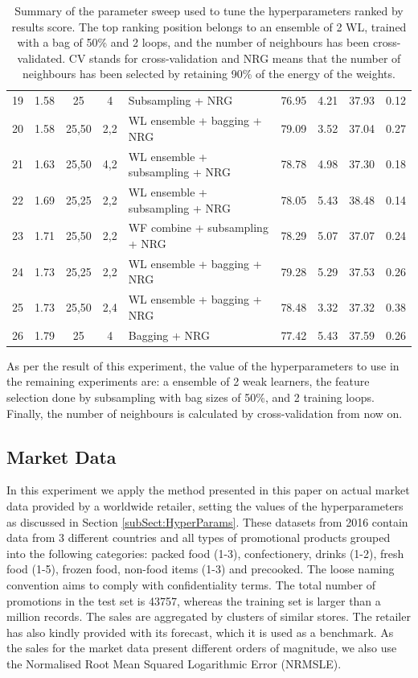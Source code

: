 \documentclass{ieeeaccess}
\begin{document}
\begin{table}[!htbp]
{\begin{tabular}{cccclrrrr}
 19 & 1.58 & 25 & 4 & Subsampling + NRG & 76.95 & 4.21 & 37.93 & 0.12 \\
 20 & 1.58 & 25,50 & 2,2 & WL ensemble + bagging + NRG & 79.09 & 3.52 & 37.04 & 0.27 \\
 21 & 1.63 & 25,50 & 4,2 & WL ensemble + subsampling + NRG & 78.78 & 4.98 & 37.30 & 0.18 \\
 22 & 1.69 & 25,25 & 2,2 & WL ensemble + subsampling + NRG & 78.05 & 5.43 & 38.48 & 0.14 \\
 23 & 1.71 & 25,50 & 2,2 & WF combine + subsampling + NRG & 78.29 & 5.07 & 37.07 & 0.24 \\
 24 & 1.73 & 25,25 & 2,2 & WL ensemble + bagging + NRG & 79.28 & 5.29 & 37.53 & 0.26 \\
 25 & 1.73 & 25,50 & 2,4 & WL ensemble + bagging + NRG & 78.48 & 3.32 & 37.32 & 0.38 \\
 26 & 1.79 & 25 & 4 & Bagging + NRG & 77.42 & 5.43 & 37.59 & 0.26 \\
\bottomrule
\end{tabular}}
\caption{Summary of the parameter sweep used to tune the hyperparameters ranked by results score. The top ranking position belongs to an ensemble of 2 WL, trained with a bag of 50\% and 2 loops, and the number of neighbours has been cross-validated. CV stands for cross-validation and NRG means that the number of neighbours has been selected by  retaining 90\% of the energy of the weights.} 
\label{tab:Hyperparameters}
\end{table}
%
As per the result of this experiment, the value of the hyperparameters to use in the remaining experiments are: a ensemble of 2 weak learners, the feature selection done by subsampling with bag sizes of 50\%, and 2 training loops. Finally, the number of neighbours is calculated by cross-validation from now on.

\subsection{Market Data} \label{subSect:TescoData}

In this experiment we apply the method presented in this paper on actual market data provided by a worldwide retailer, setting the values of the hyperparameters as discussed in Section \ref{subSect:HyperParams}. These datasets from 2016 contain data from 3 different countries and all types of promotional products grouped into the following categories: packed food (1-3), confectionery, drinks (1-2), fresh food (1-5), frozen food, non-food items (1-3) and precooked. The loose naming convention aims to comply with confidentiality terms. The total number of promotions in the test set is 43757, whereas the training set is larger than a million records. The sales are aggregated by clusters of similar stores. The retailer has also kindly provided with its forecast, which it is used as a benchmark. As the sales for the market data present different orders of magnitude, we also use the Normalised Root Mean Squared Logarithmic Error (NRMSLE).
\end{document}
